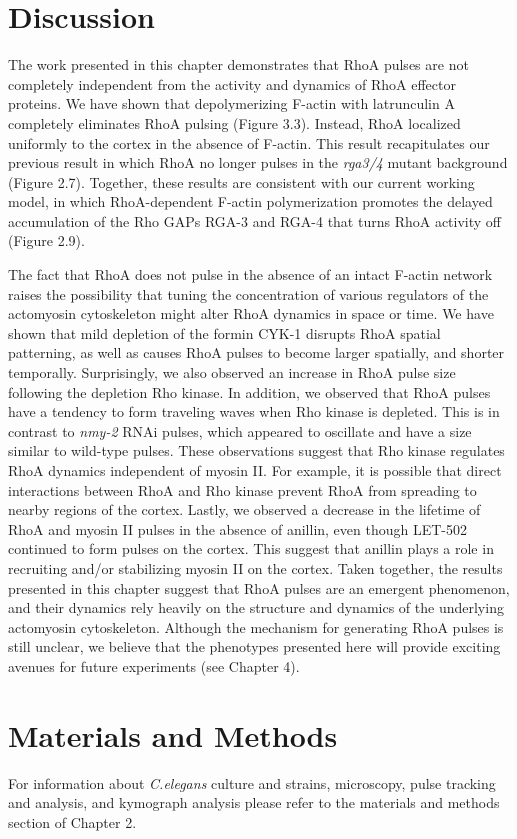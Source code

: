 \documentclass{ucetd}
\begin{document}
\section{Discussion}
The work presented in this chapter demonstrates that RhoA pulses are not completely independent from the activity and dynamics of RhoA effector proteins.  We have shown that depolymerizing F-actin with latrunculin A completely eliminates RhoA pulsing (Figure 3.3).  Instead, RhoA localized uniformly to the cortex in the absence of F-actin.  This result recapitulates our previous result in which RhoA no longer pulses in the \textit{rga3/4} mutant background  (Figure 2.7).  Together, these results are consistent with our current working model, in which RhoA-dependent F-actin polymerization promotes the delayed accumulation of the Rho GAPs RGA-3 and RGA-4 that turns RhoA activity off (Figure 2.9).

The fact that RhoA does not pulse in the absence of an intact F-actin network raises the possibility that tuning the concentration of various regulators of the actomyosin cytoskeleton might alter RhoA dynamics in space or time.  We have shown that mild depletion of the formin CYK-1 disrupts RhoA spatial patterning, as well as causes RhoA pulses to become larger spatially, and shorter temporally.  Surprisingly, we also observed an increase in RhoA pulse size following the depletion Rho kinase.  In addition, we observed that RhoA pulses have a tendency to form traveling waves when Rho kinase is depleted.  This is in contrast to \textit{nmy-2} RNAi pulses, which appeared to oscillate and have a size similar to wild-type pulses.  These observations suggest that Rho kinase regulates RhoA dynamics independent of myosin II.  For example, it is possible that direct interactions between RhoA and Rho kinase prevent RhoA from spreading to nearby regions of the cortex.  Lastly, we observed a decrease in the lifetime of RhoA and myosin II pulses in the absence of anillin, even though LET-502 continued to form pulses on the cortex.  This suggest that anillin plays a role in recruiting and/or stabilizing myosin II on the cortex.  Taken together, the results presented in this chapter suggest that RhoA pulses are an emergent phenomenon, and their dynamics rely heavily on the structure and dynamics of the underlying actomyosin cytoskeleton.  Although the mechanism for generating RhoA pulses is still unclear, we believe that the phenotypes presented here will provide exciting avenues for future experiments (see Chapter 4).


\section{Materials and Methods}
For information about \textit{C.elegans} culture and strains, microscopy, pulse tracking and analysis, and kymograph analysis please refer to the materials and methods section of Chapter 2.
\end{document}
